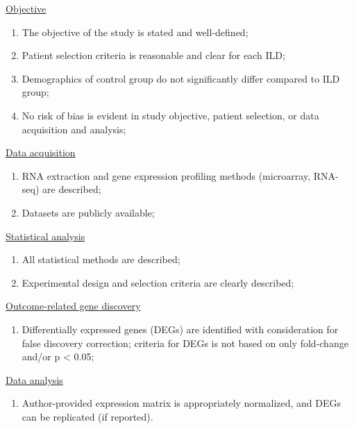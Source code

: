 \documentclass[
]{article}
\providecommand{\tightlist}{%
  \setlength{\itemsep}{0pt}\setlength{\parskip}{0pt}}
\begin{document}
\underline{Objective}

\begin{enumerate}
\def\labelenumi{\arabic{enumi}.}
\tightlist
\item
  The objective of the study is stated and well-defined;
\item
  Patient selection criteria is reasonable and clear for each ILD;
\item
  Demographics of control group do not significantly differ compared to ILD group;
\item
  No risk of bias is evident in study objective, patient selection, or data acquisition and analysis;
\end{enumerate}

\underline{Data acquisition}

\begin{enumerate}
\def\labelenumi{\arabic{enumi}.}
\setcounter{enumi}{4}
\tightlist
\item
  RNA extraction and gene expression profiling methods (microarray, RNA-seq) are described;
\item
  Datasets are publicly available;
\end{enumerate}

\underline{Statistical analysis}

\begin{enumerate}
\def\labelenumi{\arabic{enumi}.}
\setcounter{enumi}{6}
\tightlist
\item
  All statistical methods are described;
\item
  Experimental design and selection criteria are clearly described;
\end{enumerate}

\underline{Outcome-related gene discovery}

\begin{enumerate}
\def\labelenumi{\arabic{enumi}.}
\setcounter{enumi}{8}
\tightlist
\item
  Differentially expressed genes (DEGs) are identified with consideration for false discovery correction; criteria for DEGs is not based on only fold-change and/or p \textless{} 0.05;
\end{enumerate}

\underline{Data analysis}

\begin{enumerate}
\def\labelenumi{\arabic{enumi}.}
\setcounter{enumi}{9}
\tightlist
\item
  Author-provided expression matrix is appropriately normalized, and DEGs can be replicated (if reported).
\end{enumerate}
\end{document}
